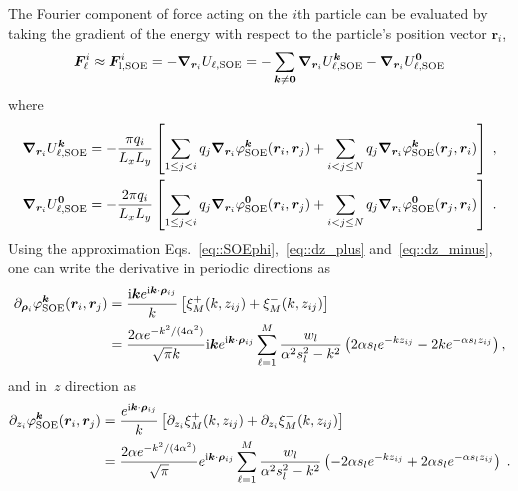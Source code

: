 The Fourier component of force acting on the $i$th particle can be evaluated by taking the gradient of the energy with respect to the particle's position vector $\bm{r}_{i}$,
\begin{equation}\label{eq::Fi}
	\boldsymbol{F}_{\ell}^i  \approx \boldsymbol{F}^{i}_{\text{l},\text{SOE}} = -\boldsymbol{\nabla}_{\boldsymbol{r}_{i}} U_{\ell,\text{SOE}} =  -\sum_{\bm{k}\neq \bm{0}} \boldsymbol{\nabla}_{\boldsymbol{r}_{i}}U_{\ell,\text{SOE}}^{\boldsymbol{k}} -\boldsymbol{\nabla}_{\boldsymbol{r}_{i}} U_{\ell,\text{SOE}}^{\boldsymbol{0}}
\end{equation}
where
\begin{align}    
	\boldsymbol{\nabla}_{\boldsymbol{r}_{i}}U_{\ell,\text{SOE}}^{\boldsymbol{k}} &= - \frac{\pi q_{i}}{L_x L_y} \left[ \sum_{1 \leq j < i} q_{j} \boldsymbol{\nabla}_{\boldsymbol{r}_{i}} \varphi_{\text{SOE}}^{\boldsymbol{k}}(\boldsymbol{r}_{i}, \boldsymbol{r}_{j}) +  \sum_{i < j \leq N} q_{j} \boldsymbol{\nabla}_{\boldsymbol{r}_{i}} \varphi_{\text{SOE}}^{\boldsymbol{k}}(\boldsymbol{r}_{j}, \boldsymbol{r}_{i}) \right]\;,\\
	\boldsymbol{\nabla}_{\boldsymbol{r}_{i}} U_{\ell,\text{SOE}}^{\boldsymbol{0}} &= - \frac{2 \pi q_{i}}{L_x L_y} \left[ \sum_{1 \leq j < i} q_{j} \boldsymbol{\nabla}_{\boldsymbol{r}_{i}} \varphi^{\bm{0}}_{\text{SOE}}(\bm{r}_{i}, \bm{r}_{j}) + \sum_{i < j \leq N} q_{j} \boldsymbol{\nabla}_{\boldsymbol{r}_{i}} \varphi^{\bm{0}}_{\text{SOE}}(\bm{r}_{j}, \bm{r}_{i})\right]\;.
\end{align}
Using the approximation Eqs.~\eqref{eq::SOEphi},~\eqref{eq::dz_plus} and~\eqref{eq::dz_minus}, one can write the derivative in periodic directions as
\begin{equation}
	\begin{split}
		\partial_{\bm{\rho}_{i}} \varphi_{\text{SOE}}^{\boldsymbol{k}}(\boldsymbol{r}_{i}, \boldsymbol{r}_{j}) & = \frac{\mathrm{i} \boldsymbol{k} e^{ \mathrm{i} \boldsymbol{k} \cdot \boldsymbol{\rho}_{ij}}}{k} \left[\xi^{+}_M(k, z_{ij})+\xi^{-}_M(k, z_{ij})\right]\\
		&=\frac{2\alpha e^{-k^2/(4\alpha^2)}}{\sqrt{\pi}k} \mathrm{i} \bm{k}e^{\mathrm{i} \boldsymbol{k} \cdot \boldsymbol{\rho}_{ij}} \sum_{\ell = 1}^{M}  \frac{w_l}{\alpha^2 s_l^2 - k^2}\left( 2 \alpha s_l e^{-k z_{ij}} - 2 k e^{-\alpha s_l z_{ij}}\right),
	\end{split}
\end{equation}
and in~$z$ direction as
\begin{equation}\label{eq:z-der}
	\begin{split}
		\partial_{z_{i}} \varphi_{\text{SOE}}^{\boldsymbol{k}}(\boldsymbol{r}_{i}, \boldsymbol{r}_{j}) & = \frac{e^{\mathrm{i} \boldsymbol{k} \cdot \boldsymbol{\rho}_{ij}}}{k} \left[\partial_{z_{i}} \xi^{+}_M(k, z_{ij}) + \partial_{z_{i}} \xi^{-}_M(k, z_{ij})\right]\\
		&=\frac{2 \alpha e^{-k^2/(4\alpha^2)}}{\sqrt{\pi}}e^{ \mathrm{i} \boldsymbol{k} \cdot \boldsymbol{\rho}_{ij}} \sum_{\ell = 1}^{M}  \frac{w_l}{\alpha^2 s_l^2 - k^2}\left( - 2 \alpha s_l e^{-k z_{ij}} + 2 \alpha s_l e^{- \alpha s_l z_{ij}}\right)\;.
	\end{split}
\end{equation}
